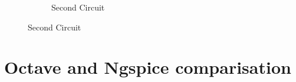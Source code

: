 \begin{figure}[h]
\begin{subfigure}{0.4\textwidth}
\caption{Second Circuit}
\label{fig:second}
\end{subfigure}

\end{figure}

\section{Octave and Ngspice comparisation}
















